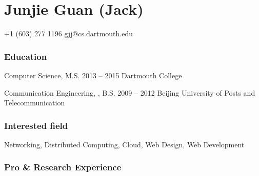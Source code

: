 \documentclass{tccv}
\begin{document}
\part{Junjie Guan (Jack)}


    {+1 (603) 277 1196}
    {gjj@cs.dartmouth.edu}

\section{Education}

\begin{yearlist}

\item[Computer Science, M.S.]{2013 -- 2015}
     {Dartmouth College}

\item[Communication Engineering, , B.S.]{2009 -- 2012}
     {Beijing University of Posts and Telecommunication}

\end{yearlist}

\section{Interested field}
Networking, Distributed Computing, Cloud, Web Design, Web Development


















\section{Pro \& Research Experience}
\end{document}
